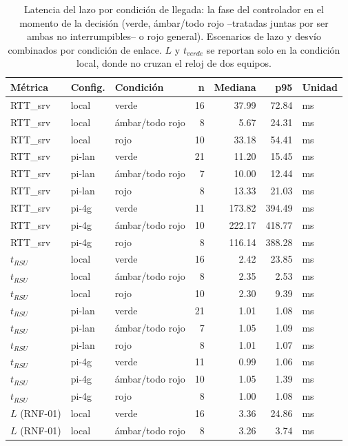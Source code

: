 \begin{table}[H]
\centering
\caption{Latencia del lazo por condición de llegada: la fase del controlador en el momento de la decisión (verde, ámbar/todo rojo --tratadas juntas por ser ambas no interrumpibles-- o rojo general). Escenarios de lazo y desvío combinados por condición de enlace. $L$ y $t_{verde}$ se reportan solo en la condición local, donde no cruzan el reloj de dos equipos.}
\label{tab:latencia_por_condicion}
\small
\begin{tabular}{lllrrrl}
\toprule
\textbf{Métrica} & \textbf{Config.} & \textbf{Condición} & \textbf{n} & \textbf{Mediana} & \textbf{p95} & \textbf{Unidad} \\
\midrule
RTT\_srv & local & verde & 16 & 37.99 & 72.84 & ms \\
RTT\_srv & local & ámbar/todo rojo & 8 & 5.67 & 24.31 & ms \\
RTT\_srv & local & rojo & 10 & 33.18 & 54.41 & ms \\
RTT\_srv & pi-lan & verde & 21 & 11.20 & 15.45 & ms \\
RTT\_srv & pi-lan & ámbar/todo rojo & 7 & 10.00 & 12.44 & ms \\
RTT\_srv & pi-lan & rojo & 8 & 13.33 & 21.03 & ms \\
RTT\_srv & pi-4g & verde & 11 & 173.82 & 394.49 & ms \\
RTT\_srv & pi-4g & ámbar/todo rojo & 10 & 222.17 & 418.77 & ms \\
RTT\_srv & pi-4g & rojo & 8 & 116.14 & 388.28 & ms \\
$t_{RSU}$ & local & verde & 16 & 2.42 & 23.85 & ms \\
$t_{RSU}$ & local & ámbar/todo rojo & 8 & 2.35 & 2.53 & ms \\
$t_{RSU}$ & local & rojo & 10 & 2.30 & 9.39 & ms \\
$t_{RSU}$ & pi-lan & verde & 21 & 1.01 & 1.08 & ms \\
$t_{RSU}$ & pi-lan & ámbar/todo rojo & 7 & 1.05 & 1.09 & ms \\
$t_{RSU}$ & pi-lan & rojo & 8 & 1.01 & 1.07 & ms \\
$t_{RSU}$ & pi-4g & verde & 11 & 0.99 & 1.06 & ms \\
$t_{RSU}$ & pi-4g & ámbar/todo rojo & 10 & 1.05 & 1.39 & ms \\
$t_{RSU}$ & pi-4g & rojo & 8 & 1.00 & 1.08 & ms \\
$L$ (RNF-01) & local & verde & 16 & 3.36 & 24.86 & ms \\
$L$ (RNF-01) & local & ámbar/todo rojo & 8 & 3.26 & 3.74 & ms \\

\end{tabular}
\end{table}
